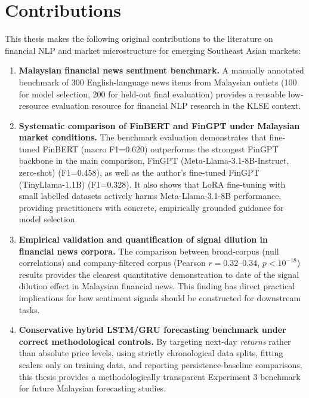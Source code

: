 \documentclass[12pt]{ucetd}
\begin{document}
\section{Contributions}

This thesis makes the following original contributions to the literature on financial NLP and market microstructure for emerging Southeast Asian markets:

\begin{enumerate}

    \item \textbf{Malaysian financial news sentiment benchmark.} A manually annotated benchmark of 300 English-language news items from Malaysian outlets (100 for model selection, 200 for held-out final evaluation) provides a reusable low-resource evaluation resource for financial NLP research in the KLSE context.

    \item \textbf{Systematic comparison of FinBERT and FinGPT under Malaysian market conditions.} The benchmark evaluation demonstrates that fine-tuned FinBERT (macro F1=0.620) outperforms the strongest FinGPT backbone in the main comparison, FinGPT (Meta-Llama-3.1-8B-Instruct, zero-shot) (F1=0.458), as well as the author's fine-tuned FinGPT (TinyLlama-1.1B) (F1=0.328). It also shows that LoRA fine-tuning with small labelled datasets actively harms Meta-Llama-3.1-8B performance, providing practitioners with concrete, empirically grounded guidance for model selection.

    \item \textbf{Empirical validation and quantification of signal dilution in financial news corpora.} The comparison between broad-corpus (null correlations) and company-filtered corpus (Pearson $r=0.32$--$0.34$, $p<10^{-18}$) results provides the clearest quantitative demonstration to date of the signal dilution effect in Malaysian financial news. This finding has direct practical implications for how sentiment signals should be constructed for downstream tasks.

    \item \textbf{Conservative hybrid LSTM/GRU forecasting benchmark under correct methodological controls.} By targeting next-day \emph{returns} rather than absolute price levels, using strictly chronological data splits, fitting scalers only on training data, and reporting persistence-baseline comparisons, this thesis provides a methodologically transparent Experiment 3 benchmark for future Malaysian forecasting studies.

\end{enumerate}
\end{document}

